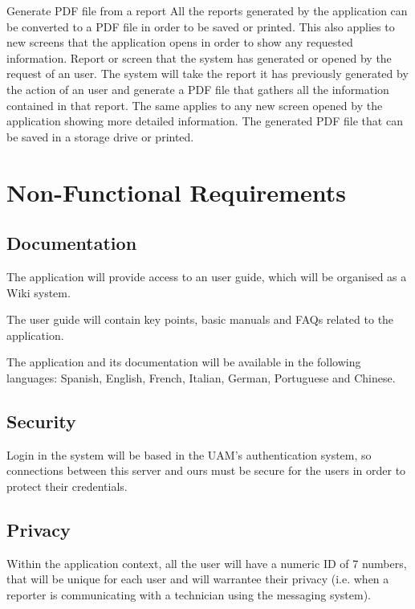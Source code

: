 \begin{requirement}{Generate PDF file from a report}
\reqdesc All the reports generated by the application can be converted to a PDF file in order to be saved or printed. This also applies to new screens that the application opens in order to show any requested information.
\reqin Report or screen that the system has generated or opened by the request of an user.
\reqsteps The system will take the report it has previously generated by the action of an user and generate a PDF file that gathers all the information contained in that report. The same applies to any new screen opened by the application showing more detailed information.
\reqout The generated PDF file that can be saved in a storage drive or printed.
\end{requirement}


\section{Non-Functional Requirements}

\subsection{Documentation}
\begin{NFrequirement}{}
The application will provide access to an user guide, which will be organised as a Wiki system. 
\end{NFrequirement}
\begin{NFrequirement}{}
The user guide will contain key points, basic manuals and FAQs related to the application.
\end{NFrequirement}
\begin{NFrequirement}{}
The application and its documentation will be available in the following languages: Spanish, English, French, Italian, German, Portuguese and Chinese.
\end{NFrequirement}

\subsection{Security}
\begin{NFrequirement}{}
Login in the system will be based in the UAM's authentication system, so connections between this server and ours must be secure for the users in order to protect their credentials.
\end{NFrequirement}

\subsection{Privacy}
\begin{NFrequirement}{}
Within the application context, all the user will have a numeric ID of 7 numbers, that will be unique for each user and will warrantee their privacy (i.e. when a reporter is communicating with a technician using the messaging system).
\end{NFrequirement}

